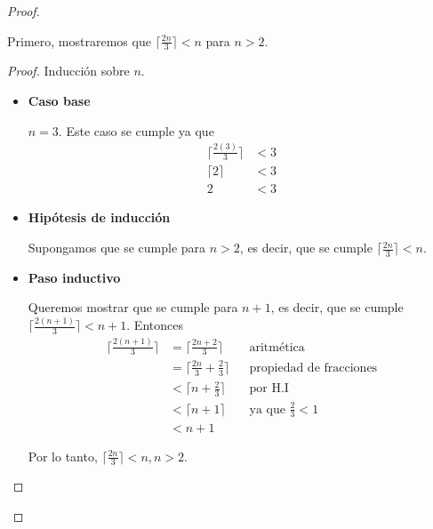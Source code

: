 \documentclass[letterpaper,11pt]{article}
\begin{document}
\begin{enumerate}
\begin{enumerate}
\begin{proof}
\begin{itemize}
                Primero, mostraremos que $\lceil \frac{2n}{3} \rceil < n$ para 
                $n > 2$.
                \begin{proof}
                    Inducción sobre $n$.
                    \begin{itemize}
                        \item \textbf{Caso base}

                        $n = 3$. Este caso se cumple ya que 
                        \begin{align*}
                            \Big \lceil \frac{2(3)}{3} \Big \rceil &< 3 \\
                            \lceil 2 \rceil &< 3 \\ 
                            2 &< 3
                        \end{align*}

                        \item \textbf{Hipótesis de inducción}

                        Supongamos que se cumple para $n > 2$, es decir, que se 
                        cumple $\lceil \frac{2n}{3} \rceil < n$.  

                        \item \textbf{Paso inductivo}
                        
                        Queremos mostrar que se cumple para $n+1$, es decir, 
                        que se cumple $\lceil \frac{2(n+1)}{3} \rceil < n+1$. 
                        Entonces 
                        \begin{align*}
                            \Big \lceil \frac{2(n+1)}{3} \Big \rceil
                            &= \Big \lceil \frac{2n + 2}{3} \Big \rceil  
                            && \text{aritmética} \\
                            &= \Big \lceil \frac{2n}{3} + \frac{2}{3} \Big \rceil
                            && \text{propiedad de fracciones} \\
                            &< \Big \lceil n + \frac{2}{3} \Big \rceil
                            && \text{por H.I} \\
                            &< \lceil n + 1 \rceil
                            && \text{ya que $\frac{2}{3} < 1$} \\
                            &< n + 1
                        \end{align*}

                        Por lo tanto, $\lceil \frac{2n}{3} \rceil < n, n > 2$.
                    \end{itemize}
                \end{proof}


\end{itemize}
\end{proof}
\end{enumerate}
\end{enumerate}
\end{document}
